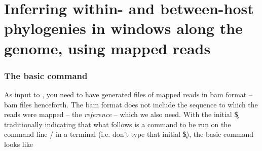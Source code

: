 \part{Inferring within- and between-host phylogenies in windows along the genome, using mapped reads}

\section{The basic command} \label{sec:The basic command}

As input to \pmt, you need to have generated files of mapped reads in bam format -- bam files henceforth.
The bam format does not include the sequence to which the reads were mapped -- the {\it reference} -- which we also need.
With the initial \c{\$} traditionally indicating that what follows is a command to be run on the command line / in a terminal (i.e. don't type that initial \c{\$}), the basic \pmt command looks like

